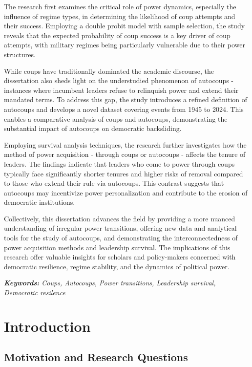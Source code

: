 \documentclass[
  12pt,
]{report}
\begin{document}
The research first examines the critical role of power dynamics,
especially the influence of regime types, in determining the likelihood
of coup attempts and their success. Employing a double probit model with
sample selection, the study reveals that the expected probability of
coup success is a key driver of coup attempts, with military regimes
being particularly vulnerable due to their power structures.

While coups have traditionally dominated the academic discourse, the
dissertation also sheds light on the understudied phenomenon of
autocoups - instances where incumbent leaders refuse to relinquish power
and extend their mandated terms. To address this gap, the study
introduces a refined definition of autocoups and develops a novel
dataset covering events from 1945 to 2024. This enables a comparative
analysis of coups and autocoups, demonstrating the substantial impact of
autocoups on democratic backsliding.

Employing survival analysis techniques, the research further
investigates how the method of power acquisition - through coups or
autocoups - affects the tenure of leaders. The findings indicate that
leaders who come to power through coups typically face significantly
shorter tenures and higher risks of removal compared to those who extend
their rule via autocoups. This contrast suggests that autocoups may
incentivize power personalization and contribute to the erosion of
democratic institutions.

Collectively, this dissertation advances the field by providing a more
nuanced understanding of irregular power transitions, offering new data
and analytical tools for the study of autocoups, and demonstrating the
interconnectedness of power acquisition methods and leadership survival.
The implications of this research offer valuable insights for scholars
and policy-makers concerned with democratic resilience, regime
stability, and the dynamics of political power.

\emph{\textbf{Keywords:} Coups, Autocoups, Power transitions, Leadership
survival, Democratic resilence}

\chapter{Introduction}\label{introduction}

\section{Motivation and Research
Questions}\label{motivation-and-research-questions}
\end{document}
